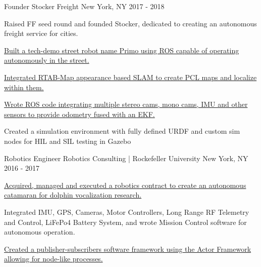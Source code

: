 

\begin{cventries}

  \cventry
    {Founder} %
    {Stocker Freight} %
    {New York, NY} %
    {2017 - 2018} %
    {
      \begin{cvitems} %
        \item {Raised FF seed round and founded Stocker, dedicated to creating an autonomous freight service for cities.}
        \item {\href{http://bit.ly/2T3Kvvs}
            {Built a tech-demo street robot name Primo using ROS capable of operating autonomously in the street.}}
        \item {\href{http://bit.ly/2TjikYy}
            {Integrated RTAB-Map appearance based SLAM to create PCL maps and localize within them.}}
        \item {\href{http://bit.ly/2T3d4sU}
            {Wrote ROS code integrating multiple stereo cams, mono cams, IMU and other sensors to provide odometry fused with an EKF.}}
        \item {Created a simulation environment with fully defined URDF and custom sim nodes for HIL and SIL testing in Gazebo}
      \end{cvitems}
    }

  \cventry
    {Robotics Engineer} %
    {Robotics Consulting | Rockefeller University} %
    {New York, NY} %
    {2016 - 2017} %
    {
      \begin{cvitems} %
        \item {\href{http://bit.ly/2Tg8zKO}{Acquired, managed and executed a robotics contract to create an autonomous catamaran for dolphin vocalization research.}}
        \item {Integrated IMU, GPS, Cameras, Motor Controllers, Long Range RF Telemetry and Control, 
                    LiFePo4 Battery System, and wrote Mission Control software for autonomous operation.}
        \item {\href{http://bit.ly/2BSBD1c}{Created a publisher-subscribers software framework using the Actor Framework allowing for node-like processes.}}
      \end{cvitems}
    }


\end{cventries}
